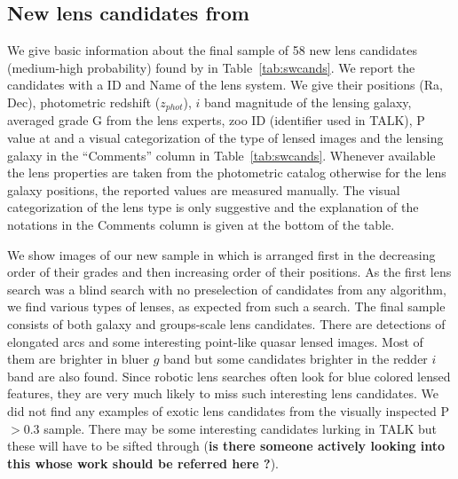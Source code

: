 \documentclass[useAMS,usenatbib,a4paper]{mn2e}
\begin{document}

\subsection{New lens candidates from \sw}
\label{sec:results:newcand}

We give basic information about the final sample of 58 new lens
candidates (medium-high probability) found by \sw in
Table~\ref{tab:swcands}. We report the candidates with a \sw ID and Name
of the lens system. We give their positions (Ra, Dec), photometric
redshift ($z_{phot}$), $i$ band magnitude of the lensing galaxy,
averaged grade G from the lens experts, zoo ID (identifier used in
TALK), P value at \StageTwo and a visual categorization of the type of
lensed images and the lensing galaxy in the ``Comments'' column in
Table~\ref{tab:swcands}. Whenever available the lens properties are
taken from the \cfhtls photometric catalog \citep{Coupon2009} otherwise
for the lens galaxy positions, the reported values are measured
manually. The visual categorization of the lens type is only suggestive
and the explanation of the notations in the Comments column is given at
the bottom of the table.

We show images of our new sample in  which is arranged
first in the decreasing order of their grades and then increasing order
of their positions. As the first lens search was a blind search with no
preselection of candidates from any algorithm, we find various types of
lenses, as expected from such a search. The final sample consists of
both galaxy and groups-scale lens candidates. There are detections of
elongated arcs and some interesting point-like quasar lensed images.
Most of them are brighter in bluer $g$ band but some candidates brighter
in the redder $i$ band are also found. Since robotic lens searches often
look for blue colored lensed features, they are very much likely to miss
such interesting lens candidates. We did not find any examples of
exotic lens candidates from the visually inspected P$>0.3$ sample. There
may be some interesting candidates lurking in TALK but these will have
to be sifted through ({\bf is there someone actively looking into this
whose work should be referred here ?}). 
\end{document}
